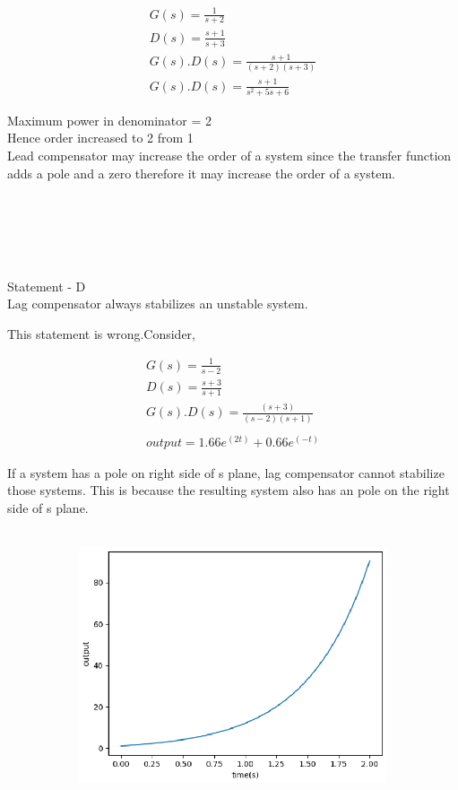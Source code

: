 \begin{enumerate}[label=\thesection.\arabic*.,ref=\thesection.\theenumi]
\begin{align}
G(s) = \frac{1}{s+2}\\
D(s) = \frac{s+1}{s+3}\\
G(s)\textbf{.}D(s) = \frac{s+1}{(s+2)(s+3)}\\
G(s)\textbf{.}D(s) = \frac{s+1}{s^2+5s+6}
\end{align}
\begin{flushleft}
Maximum power in denominator = 2\\
Hence order increased to 2 from 1\\
Lead compensator may increase the order of a system
since the transfer function adds a pole and a zero therefore it may increase the order of a system.\\
\end{flushleft}
\\
\\
\\
\\
\begin{flushleft}
Statement - D\\ Lag compensator always stabilizes an unstable system.
\begin{flushleft}
This statement is wrong.Consider,\\
\end{flushleft}
\begin{align}
G(s) = \frac{1}{s-2}\\
D(s) = \frac{s+3}{s+1}\\
G(s)\textbf{.}D(s) = \frac{(s+3)}{(s-2)(s+1)}\\ \\
output = 1.66e^{(2t)} + 0.66e^{(-t)}
\end{align}
\begin{flushleft}
If a system has a pole on right side of s plane, lag compensator cannot stabilize those systems. This is because the resulting system also has an pole on the right side of s plane.
\end{flushleft}


\textbf{}\begin{figure}[h]
 
\begin{subfigure}{\textwidth}
\includegraphics[width=1.05\linewidth, height=8cm ,inner]{./figs/ee18btech11027/unstable.eps} 
\label{fig:subim1}
\end{subfigure}
\end{figure}


\end{flushleft}
\end{enumerate}
